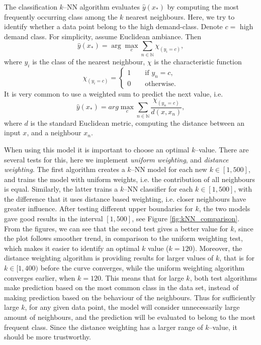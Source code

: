     The classification  $k$--NN algorithm evaluates $\hat{y}(x_{*})$ by computing the most frequently occurring class among the $k$ nearest neighbours. Here, we try to identify whether a data point belong to the high demand-class. Denote $c=$ high demand class. For simplicity, assume Euclidean ambiance. Then
        \begin{equation*}
            \hat{y}(x_*) = \arg \max_{c}  \sum_{n \in \mathbb{N}} \chi_{(y_i = c)} ,
        \end{equation*}
    where $y_i$ is the class of the nearest neighbour,  $\chi$ is the characteristic function 
        \begin{equation*}
            \chi_{(y_i = c)} = 
            \begin{cases}
                1 \qquad \text{if } y_n = c, \\
                0 \qquad \text{otherwise}.
                
            \end{cases}
        \end{equation*}
    It is very common to use a weighted sum to predict the next value, i.e.
        \begin{equation*}
            \hat{y}(x_*) =  arg \max_{c}  \sum_{n \in \mathbb{N}} \frac{\chi_{(y_n = c)}}{d(x, x_n)},
        \end{equation*}
    where $d$ is the standard Euclidean metric, computing the distance between an input $x$, and a neighbour $x_n$. 

    When using this model it is important to choose an optimal $k$--value. There are several tests for this, here we implement \emph{uniform weighting}, and \emph{distance weighting}. The first algorithm creates a $k$--NN model for each new $k \in [1, 500]$, and trains the model with uniform weights, i.e. the contribution of all neighbours is equal. Similarly, the latter trains a $k$--NN classifier for each $k \in [1, 500]$, with the difference that it uses distance based weighting, i.e. closer neighbours have greater influence. After testing different upper boundaries for $k$, the two models gave good results in the interval $[1,500]$, see Figure \ref{fig:kNN_comparison}. From the figures, we can see that the second test gives a better value for $k$, since the plot follows smoother trend, in comparison to the uniform weighting test, which makes it easier to identify an optimal $k$ value ($k = 120$). Moreover, the distance weighting algorithm is providing results for larger values of $k$, that is for $k \in [1, 400)$ before the curve converges, while the uniform weighting algorithm converges earlier, when $k = 120$. This means that for large $k$, both test algorithms make prediction based on the most common class in the data set, instead of making prediction based on the behaviour of the neighbours. Thus for sufficiently large $k$, for any given data point, the model will consider unnecessarily large amount of neighbours, and the prediction will be evaluated to belong to the most frequent class. Since the distance weighting has a larger range of $k$--value, it should be more trustworthy.

